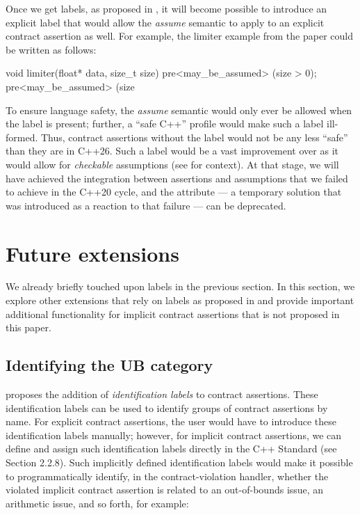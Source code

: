 Once we get labels, as proposed in \cite{P3400R1}, it will become possible to introduce an explicit label that would allow the \emph{assume} semantic to apply to an explicit contract assertion as well. For example, the limiter example from the \tcode{[[assume]]} paper \cite{P1774R8} could be written as follows:
\begin{codeblock}
void limiter(float* data, size_t size)
  pre<may_be_assumed> (size > 0);
  pre<may_be_assumed> (size %
\end{codeblock}
To ensure language safety, the \emph{assume} semantic would only ever be allowed when the \mbox{} label is present; further, a ``safe C++'' profile would make such a label ill-formed. Thus, contract assertions without the label would not be any less ``safe'' than they are in C++26. Such a label would be a vast improvement over \tcode{[[assume]]} as it would allow for \emph{checkable} assumptions (see \cite{P2064R0} for context). At that stage, we will have achieved the integration between assertions and assumptions that we failed to achieve in the C++20 cycle, and the \tcode{[[assume]]} attribute --- a temporary solution that was introduced as a reaction to that failure --- can be deprecated.

\section{Future extensions}
\label{ext}

We already briefly touched upon labels in the previous section. In this section, we explore other extensions that rely on labels as proposed in \cite{P3400R1} and provide important additional functionality for implicit contract assertions that is not proposed in this paper.

\subsection{Identifying the UB category}
\label{idlabels}

\cite{P3400R1} proposes the addition of \emph{identification labels} to contract assertions. These identification labels can be used to identify groups of contract assertions by name. For explicit contract assertions, the user would have to introduce these identification labels manually; however, for implicit contract assertions, we can define and assign such identification labels directly in the C++ Standard (see \cite{P3400R1} Section 2.2.8). Such implicitly defined identification labels would make it possible to programmatically identify, in the contract-violation handler, whether the violated implicit contract assertion  is related to an out-of-bounds issue, an arithmetic issue, and so forth, for example:

